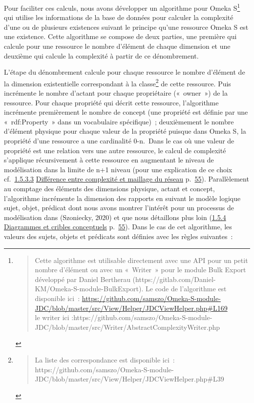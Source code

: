 \documentclass[
  a4paper,
  DIV=11,
  numbers=noendperiod]{scrreprt}
\begin{document}
Pour faciliter ces calculs, nous avons développer un algorithme pour
Omeka S\footnote{\begin{quote}
  Cette algorithme est utilisable directement avec une API pour un petit
  nombre d'élément ou avec un «~Writer~» pour le module Bulk Export
  développé par Daniel Bertherau
  (https://gitlab.com/Daniel-KM/Omeka-S-module-BulkExport). Le code de
  l'algorithme est disponible ici~:
  \url{https://github.com/samszo/Omeka-S-module-JDC/blob/master/src/View/Helper/JDCViewHelper.php\#L169}\\
  le writer ici
  :https://github.com/samszo/Omeka-S-module-JDC/blob/master/src/Writer/AbstractComplexityWriter.php
  \end{quote}} qui utilise les informations de la base de données pour
calculer la complexité d'une ou de plusieurs existences suivant le
principe qu'une ressource Omeka S est une existence. Cette algorithme se
compose de deux parties, une première qui calcule pour une ressource le
nombre d'élément de chaque dimension et une deuxième qui calcule la
complexité à partir de ce dénombrement.

L'étape du dénombrement calcule pour chaque ressource le nombre
d'élément de la dimension existentielle correspondant à la
classe\footnote{\begin{quote}
  La liste des correspondance est disponible ici~:
  https://github.com/samszo/Omeka-S-module-JDC/blob/master/src/View/Helper/JDCViewHelper.php\#L39
  \end{quote}} de cette ressource. Puis incrémente le nombre d'actant
pour chaque propriétaire («~owner~») de la ressource. Pour chaque
propriété qui décrit cette ressource, l'algorithme incrémente
premièrement le nombre de concept (une propriété est définie par une
«~rdf:Property~» dans un vocabulaire spécifique)~; deuxièmement le
nombre d'élément physique pour chaque valeur de la propriété puisque
dans Omeka S, la propriété d'une ressource a une cardinalité 0-n.~Dans
le cas où une valeur de propriété est une relation vers une autre
ressource, le calcul de complexité s'applique récursivement à cette
ressource en augmentant le niveau de modélisation dans la limite de n+1
niveau (pour une explication de ce choix
cf.~\hyperref[anchor-65]{1.5.3.3} \hyperref[anchor-65]{Différence entre
complexité et maillage du réseau} p.~\hyperref[anchor-65]{55}).
Parallèlement au comptage des éléments des dimensions physique, actant
et concept, l'algorithme incrémente la dimension des rapports en suivant
le modèle logique sujet, objet, prédicat dont nous avons montrer
l'intérêt pour un processus de modélisation dans (Szoniecky, 2020) et
que nous détaillons plus loin (\hyperref[anchor-66]{1.5.4}
\hyperref[anchor-66]{Diagrammes et cribles conceptuels}
p.~\hyperref[anchor-66]{55}). Dans le cas de cet algorithme, les valeurs
des sujets, objets et prédicats sont définies avec les règles
suivantes~:
\end{document}
